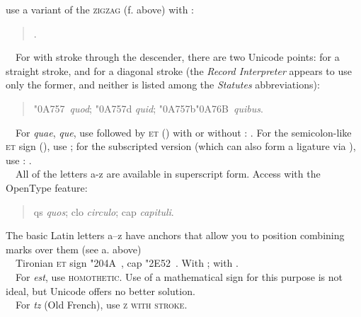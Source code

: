 use a variant of the \textsc{zigzag} (f. above) with :
\begin{quote}
.
\end{quote}
\noindent{}\ \ For  with stroke through the descender, there are two Unicode points:  for a
straight stroke, and  for a diagonal stroke (the \textit{Record Interpreter} appears to use only the
former, and neither is listed among the \textit{Statutes} abbreviations):
\begin{quote}
\char"0A757\ \textit{quod}; \char"0A757d \textit{quid}; \char"0A757b\char"0A76B\ \textit{quibus}.
\end{quote}
\noindent{}\ \ For \textit{quae}, \textit{que}, use 
followed by \textsc{et} () with or without : 
. For the semicolon-like \textsc{et} sign (), use
; for the subscripted version (which can also form a ligature via ), 
use :
.\\[1ex]

\noindent{}\ \ All of the letters a-z are available in superscript form. Access with the 
OpenType feature:
\begin{quote}
qs \textit{quos}; clo \textit{circulo}; cap \textit{capituli}.
\end{quote}
The basic Latin letters a--z have anchors that allow you to position combining marks over them (see a. above)\\[1ex]

\noindent{}\ \ Tironian \textsc{et} sign \char"204A\ , cap \char"2E52\ . 
With  ; with
 .\\[1ex]

\noindent{}\ \ For \textit{est}, use   \textsc{homothetic}. Use of a mathematical sign for this
purpose is not ideal, but Unicode offers no better solution.\\[1ex]

\noindent{}\ \ For \textit{tz} (Old French), use   \textsc{z with stroke}.\\[1ex]


